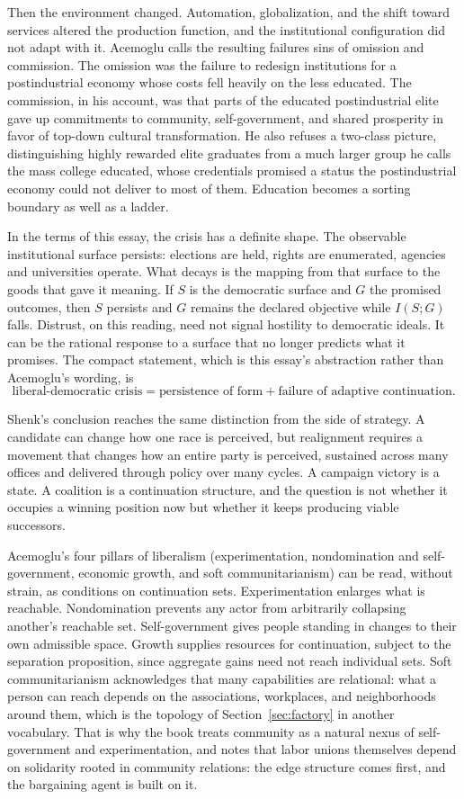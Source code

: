 \documentclass[11pt]{article}
\begin{document}
Then the environment changed. Automation, globalization, and the shift toward services altered the production function, and the institutional configuration did not adapt with it. Acemoglu calls the resulting failures sins of omission and commission. The omission was the failure to redesign institutions for a postindustrial economy whose costs fell heavily on the less educated. The commission, in his account, was that parts of the educated postindustrial elite gave up commitments to community, self-government, and shared prosperity in favor of top-down cultural transformation. He also refuses a two-class picture, distinguishing highly rewarded elite graduates from a much larger group he calls the mass college educated, whose credentials promised a status the postindustrial economy could not deliver to most of them. Education becomes a sorting boundary as well as a ladder.

In the terms of this essay, the crisis has a definite shape. The observable institutional surface persists: elections are held, rights are enumerated, agencies and universities operate. What decays is the mapping from that surface to the goods that gave it meaning. If $S$ is the democratic surface and $G$ the promised outcomes, then $S$ persists and $G$ remains the declared objective while $I(S;G)$ falls. Distrust, on this reading, need not signal hostility to democratic ideals. It can be the rational response to a surface that no longer predicts what it promises. The compact statement, which is this essay's abstraction rather than Acemoglu's wording, is
\[
\text{liberal-democratic crisis} = \text{persistence of form} + \text{failure of adaptive continuation}.
\]

Shenk's conclusion reaches the same distinction from the side of strategy. A candidate can change how one race is perceived, but realignment requires a movement that changes how an entire party is perceived, sustained across many offices and delivered through policy over many cycles. A campaign victory is a state. A coalition is a continuation structure, and the question is not whether it occupies a winning position now but whether it keeps producing viable successors.

Acemoglu's four pillars of liberalism (experimentation, nondomination and self-government, economic growth, and soft communitarianism) can be read, without strain, as conditions on continuation sets. Experimentation enlarges what is reachable. Nondomination prevents any actor from arbitrarily collapsing another's reachable set. Self-government gives people standing in changes to their own admissible space. Growth supplies resources for continuation, subject to the separation proposition, since aggregate gains need not reach individual sets. Soft communitarianism acknowledges that many capabilities are relational: what a person can reach depends on the associations, workplaces, and neighborhoods around them, which is the topology of Section~\ref{sec:factory} in another vocabulary. That is why the book treats community as a natural nexus of self-government and experimentation, and notes that labor unions themselves depend on solidarity rooted in community relations: the edge structure comes first, and the bargaining agent is built on it.
\end{document}
